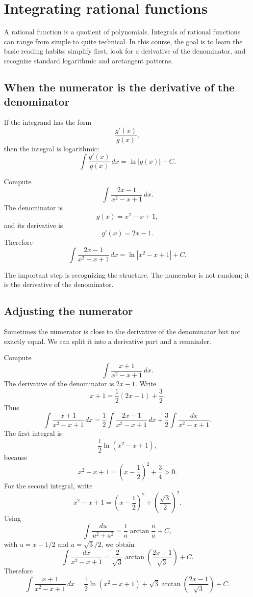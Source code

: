 \section{Integrating rational functions}

A rational function is a quotient of polynomials. Integrals of rational functions can range from simple to quite technical. In this course, the goal is to learn the basic reading habits: simplify first, look for a derivative of the denominator, and recognize standard logarithmic and arctangent patterns.

\subsection*{When the numerator is the derivative of the denominator}

If the integrand has the form
\[
\frac{g'(x)}{g(x)},
\]
then the integral is logarithmic:
\[
\int \frac{g'(x)}{g(x)}\,dx=\ln|g(x)|+C.
\]

\begin{examplebox}
Compute
\[
\int \frac{2x-1}{x^2-x+1}\,dx.
\]
The denominator is
\[
g(x)=x^2-x+1,
\]
and its derivative is
\[
g'(x)=2x-1.
\]
Therefore
\[
\int \frac{2x-1}{x^2-x+1}\,dx=\ln|x^2-x+1|+C.
\]
\end{examplebox}

The important step is recognizing the structure. The numerator is not random; it is the derivative of the denominator.

\subsection*{Adjusting the numerator}

Sometimes the numerator is close to the derivative of the denominator but not exactly equal. We can split it into a derivative part and a remainder.

\begin{examplebox}
Compute
\[
\int \frac{x+1}{x^2-x+1}\,dx.
\]
The derivative of the denominator is \(2x-1\). Write
\[
x+1=\frac12(2x-1)+\frac32.
\]
Thus
\[
\int \frac{x+1}{x^2-x+1}\,dx
=\frac12\int \frac{2x-1}{x^2-x+1}\,dx
+\frac32\int \frac{dx}{x^2-x+1}.
\]
The first integral is
\[
\frac12\ln(x^2-x+1),
\]
because
\[
x^2-x+1=\left(x-\frac12\right)^2+\frac34>0.
\]
For the second integral, write
\[
x^2-x+1
=
\left(x-\frac12\right)^2+\left(\frac{\sqrt3}{2}\right)^2.
\]
Using
\[
\int \frac{du}{u^2+a^2}
=
\frac1a\arctan\frac{u}{a}+C,
\]
with \(u=x-1/2\) and \(a=\sqrt3/2\), we obtain
\[
\int \frac{dx}{x^2-x+1}
=
\frac{2}{\sqrt3}
\arctan\left(\frac{2x-1}{\sqrt3}\right)+C.
\]
Therefore
\[
\boxed{
\int \frac{x+1}{x^2-x+1}\,dx
=
\frac12\ln(x^2-x+1)
+
\sqrt3\arctan\left(\frac{2x-1}{\sqrt3}\right)
+C
}.
\]
\end{examplebox}

